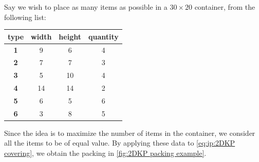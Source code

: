 \begin{example}
    Say we wish to place as many items as possible in a $30 \times 20$ container, from the following list:

    \begin{table}[h]
        \centering
        \begin{tabular}{cccc}
            \toprule
            \textbf{type} & \textbf{width} & \textbf{height} & \textbf{quantity}\\
            \midrule
            \textbf{1} & 9 & 6 & 4\\
            \textbf{2} & 7 & 7 & 3\\
            \textbf{3} & 5 & 10 & 4\\
            \textbf{4} & 14 & 14 & 2\\
            \textbf{5} & 6 & 5 & 6\\
            \textbf{6} & 3 & 8 & 5\\
            \bottomrule
        \end{tabular}
    \end{table}

    Since the idea is to maximize the number of items in the container, we consider all the items to be of equal value. By applying these data to \cref{eq:ip:2DKP covering}, we obtain the packing in \cref{fig:2DKP packing example}.


\end{example}
